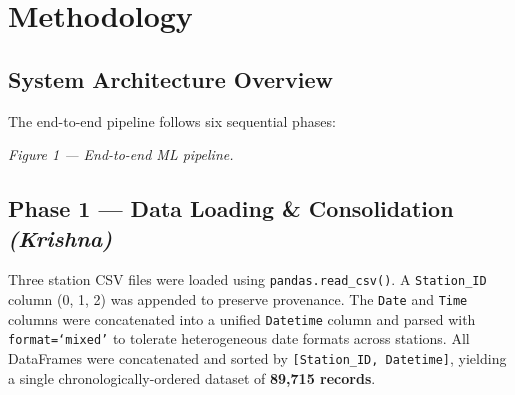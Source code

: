\documentclass[12pt, a4paper]{article}
\begin{document}
\section{Methodology}

\subsection{System Architecture Overview}

The end-to-end pipeline follows six sequential phases:

\vspace{0.5em}
\begin{center}
\end{center}
{\centering\small\itshape\color{midgray} Figure 1 --- End-to-end ML pipeline.\par}
\vspace{0.5em}

\subsection{Phase 1 --- Data Loading \& Consolidation \textnormal{\small\itshape(Krishna)}}

Three station CSV files were loaded using \texttt{pandas.read\_csv()}. A \texttt{Station\_ID}
column (0, 1, 2) was appended to preserve provenance. The \texttt{Date} and \texttt{Time}
columns were concatenated into a unified \texttt{Datetime} column and parsed with
\texttt{format=`mixed'} to tolerate heterogeneous date formats across stations. All
DataFrames were concatenated and sorted by \texttt{[Station\_ID, Datetime]}, yielding
a single chronologically-ordered dataset of \textbf{89,715 records}.
\end{document}
